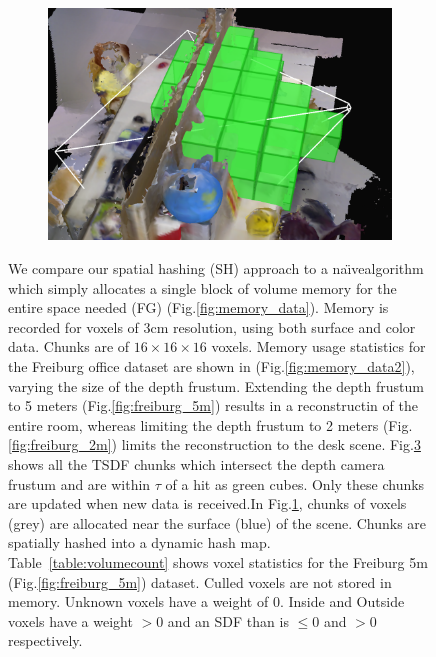 \documentclass[10pt,twocolumn,letterpaper]{article}
\newcommand{\figref}[1]{Fig.\ref{#1}}
\newcommand{\tabref}[1]{Table~\ref{#1}}
\newcommand{\naive}{na\"{\i}ve}
\begin{document}
\begin{figure}
\begin{minipage}{0.45\linewidth}
\begin{subfigure}{0.45\linewidth}
 	      \caption{}
 	  	\label{fig:chunks} 
 	  \end{subfigure} 
 	  \begin{subfigure}{0.45\linewidth} \centering
	      \includegraphics[width=1.0\textwidth]{img/frustum_cull}
	      \caption{}
	 	 \label{fig:frustum_cull}
	  \end{subfigure}
   \end{minipage}
  \caption{ We compare our spatial hashing (SH)
      approach to a \naive algorithm which simply allocates a single
      block of volume memory for the entire space needed (FG)
      (\figref{fig:memory_data}). Memory is recorded for voxels of 3cm
      resolution, using both surface and color data. Chunks are of $16 \times 16 \times 16$ voxels. Memory
      usage statistics for the Freiburg \cite{FREIBURG} office dataset are shown
      in (\figref{fig:memory_data2}), varying the size of the depth frustum.
      Extending the depth frustum to 5 meters (\figref{fig:freiburg_5m}) results in a reconstructin of the entire
      room, whereas limiting the depth frustum to 2 meters
      (\figref{fig:freiburg_2m}) limits the reconstruction to the desk scene.
      \figref{fig:frustum_cull} shows all the TSDF chunks which intersect the
      depth camera frustum  and are within $\tau$ of a hit as green cubes. Only
      these chunks are updated when new data is received.In \figref{fig:chunks}, chunks of voxels (grey) are allocated near
  the surface (blue) of the scene. Chunks are spatially hashed \cite{SpatialHashing} into a
      dynamic hash map. \tabref{table:volumecount} shows voxel statistics for
      the Freiburg 5m (\figref{fig:freiburg_5m}) dataset. Culled voxels are not stored in
       memory. Unknown voxels have a weight of 0. Inside and Outside voxels have
      a weight $> 0$ and an SDF than is $\leq 0$ and $> 0$ respectively. }
\end{figure} 
\end{document}
